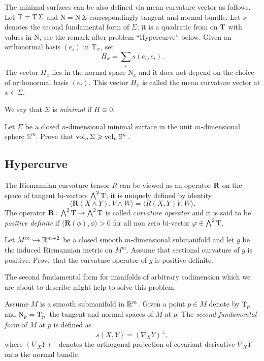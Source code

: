 The minimal surfaces can be also defined via mean curvature vector as follows.
Let $\mathrm{T}=\mathrm{T}\,\Sigma$ and $\mathrm{N}=\mathrm{N}\,\Sigma$ correspondingly tangent and normal bundle.
Let $s$ denotes the second fundamental form of $\Sigma$;
it is a quadratic from on $\mathrm{T}$ with values in $\mathrm{N}$,
see the remark after problem ``Hypercurve'' below. 
Given an orthonormal basis $(e_i)$ in $\mathrm{T}_x$, 
set 
$$H_x=\sum_i s(e_i,e_i).$$
The vector $H_x$ lies in the normal space $\mathrm{N}_x$
and it does not depend on the choice of orthonormal basis $(e_i)$.
This vector $H_x$ is called the mean curvature vector at $x\in \Sigma$. 

We say that $\Sigma$ is \emph{minimal} if $H\equiv 0$.

\begin{pr}
Let $\Sigma$ be a closed $n$-dimensional 
minimal surface
in the unit $m$-dimensional sphere $\mathbb{S}^m$.
Prove that
$\operatorname{\rm vol}\nolimits_n \Sigma\geqslant \operatorname{\rm vol}\nolimits_n \mathbb{S}^n$.
\end{pr}

\subsection*{Hypercurve}
\label{codim=2}

The Riemannian curvature tensor $R$
can be viewed as an operator $\text{\bf R}$ on the space of tangent bi-vectors $\bigwedge^2 \mathrm{T}$;
it is uniquely defined by identity
$$\langle\mathbf{R}(X\wedge Y),V\wedge W\rangle
=
\langle R(X,Y)V,W\rangle.$$
The operator $\mathbf{R}\colon\bigwedge^2 \mathrm{T}\to \bigwedge^2 \mathrm{T}$ is called \emph{curvature operator} and it is said to be {}\emph{positive definite} if
$\langle\mathbf{R}(\phi),\phi\rangle>0$ for all non zero
bi-vector $\varphi\in\bigwedge^2 \mathrm{T}$.


\begin{pr}
Let $M^m\hookrightarrow \mathbb{R}^{m+2}$ be a closed smooth $m$-dimensional
submanifold and let  $g$ be the  induced Riemannian metric on $M^m$.
Assume that sectional curvature of $g$ is positive.
Prove that the curvature operator of $g$ is positive definite.
\end{pr}

The second fundamental form for manifolds of arbitrary codimension which we are about to describe might help to solve this problem.

Assume $M$ is a smooth submanifold in $\mathbb{R}^m$.
Given a point $p\in M$ denote by $\mathrm{T}_p$ and $\mathrm{N}_p=\mathrm{T}_p^\bot$
the tangent and normal spaces of $M$ at $p$.
The \emph{second fundamental form}\label{page:second fundamental form} of $M$ at $p$ is defined as $$s(X,Y)=(\nabla_X Y)^\bot,$$ 
where $(\nabla_X Y)^\bot$ denotes the orthogonal projection of covariant derivative $\nabla_X Y$ onto the normal bundle.

